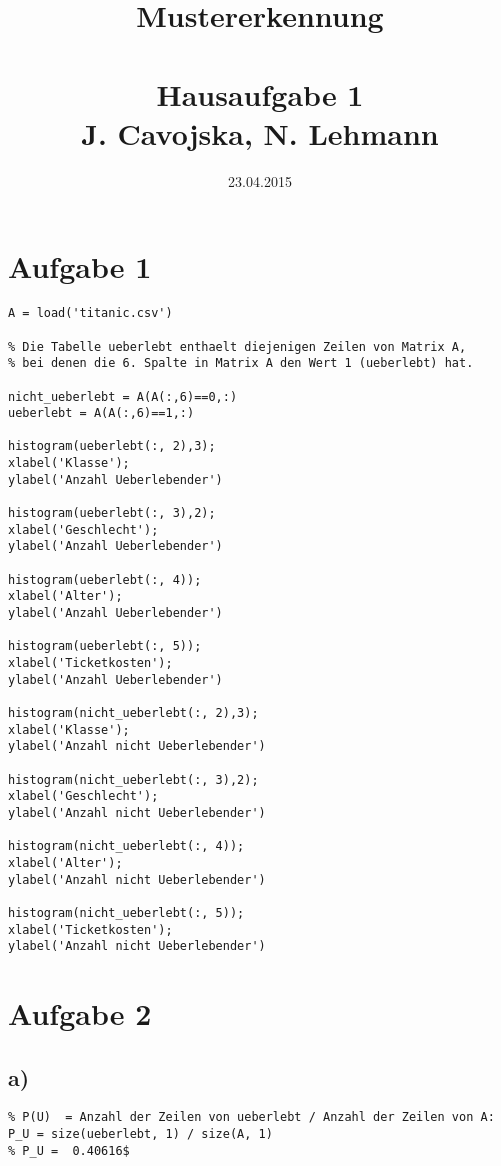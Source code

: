 \documentclass{article}
\title{Mustererkennung\\~\\Hausaufgabe 1\\ \small{J. Cavojska, N. Lehmann}}
\date{23.04.2015}
\begin{document}
\maketitle

\section*{Aufgabe 1}

\begin{verbatim}
A = load('titanic.csv')

% Die Tabelle ueberlebt enthaelt diejenigen Zeilen von Matrix A,
% bei denen die 6. Spalte in Matrix A den Wert 1 (ueberlebt) hat.

nicht_ueberlebt = A(A(:,6)==0,:)
ueberlebt = A(A(:,6)==1,:) 

histogram(ueberlebt(:, 2),3);
xlabel('Klasse');
ylabel('Anzahl Ueberlebender')

histogram(ueberlebt(:, 3),2);
xlabel('Geschlecht');
ylabel('Anzahl Ueberlebender')

histogram(ueberlebt(:, 4));
xlabel('Alter');
ylabel('Anzahl Ueberlebender')

histogram(ueberlebt(:, 5));
xlabel('Ticketkosten');
ylabel('Anzahl Ueberlebender')

histogram(nicht_ueberlebt(:, 2),3);
xlabel('Klasse');
ylabel('Anzahl nicht Ueberlebender')

histogram(nicht_ueberlebt(:, 3),2);
xlabel('Geschlecht');
ylabel('Anzahl nicht Ueberlebender')

histogram(nicht_ueberlebt(:, 4));
xlabel('Alter');
ylabel('Anzahl nicht Ueberlebender')

histogram(nicht_ueberlebt(:, 5));
xlabel('Ticketkosten');
ylabel('Anzahl nicht Ueberlebender')
\end{verbatim}

\section*{Aufgabe 2}

\subsection*{a)}

\begin{verbatim}
% P(U)  = Anzahl der Zeilen von ueberlebt / Anzahl der Zeilen von A:
P_U = size(ueberlebt, 1) / size(A, 1)
% P_U =  0.40616$
\end{verbatim}
\end{document}
